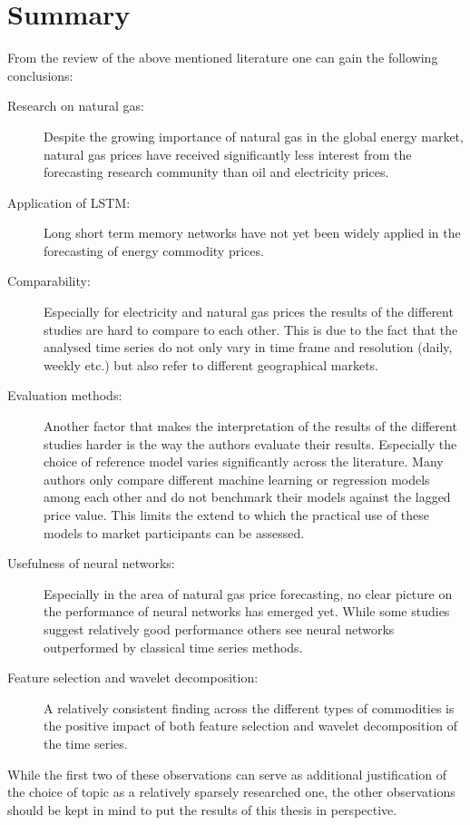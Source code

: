 

\section{Summary}
From the review of the above mentioned literature one can gain the following conclusions:
\begin{description}
\item[Research on natural gas:] Despite the growing importance of natural gas in the global energy market, natural gas prices have received significantly less interest from the forecasting research community than oil and electricity prices.
\item[Application of LSTM:] Long short term memory networks have not yet been widely applied in the forecasting of energy commodity prices.
\item[Comparability:] Especially for electricity and natural gas prices the results of the different studies are hard to compare to each other. This is due to the fact that the analysed time series do not only vary in time frame and resolution (daily, weekly etc.) but also refer to different geographical markets. 
\item[Evaluation methods:] Another factor that makes the interpretation of the results of the different studies harder is the way the authors evaluate their results. Especially the choice of reference model varies significantly across the literature. Many authors only compare different machine learning or regression models among each other and do not benchmark their models against the lagged price value. This limits the extend to which the practical use of these models to market participants can be assessed.
\item[Usefulness of neural networks:] Especially in the area of natural gas price forecasting, no clear picture on the performance of neural networks has emerged yet. While some studies suggest relatively good performance others see neural networks outperformed by classical time series methods.
\item[Feature selection and wavelet decomposition:] A relatively consistent finding across the different types of commodities is the positive impact of both feature selection and wavelet decomposition of the time series.
\end{description}
While the first two of these observations can serve as additional justification of the choice of topic as a relatively sparsely researched one, the other observations should be kept in mind to put the results of this thesis in perspective.
